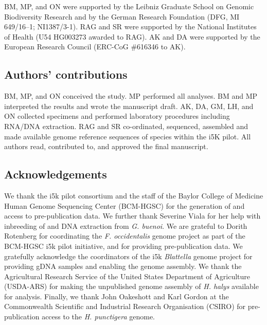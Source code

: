 BM, MP, and ON were supported by the Leibniz Graduate School on Genomic
Biodiversity Research and by the German Research Foundation (DFG, MI
649/16--1; NI1387/3-1). RAG and SR were supported by the National
Institutes of Health (U54 HG003273 awarded to RAG). AK and DA were
supported by the European Research Council (ERC-CoG \#616346 to AK).

\subsection{Authors' contributions}\label{authors-contributions}

BM, MP, and ON conceived the study. MP performed all analyses. BM and MP
interpreted the results and wrote the manuscript draft. AK, DA, GM, LH,
and ON collected specimens and performed laboratory procedures including
RNA/DNA extraction. RAG and SR co-ordinated, sequenced, assembled and
made available genome reference sequences of species within the i5K
pilot. All authors read, contributed to, and approved the final
manuscript.

\subsection{Acknowledgements}\label{acknowledgements}

We thank the i5k pilot consortium and the staff of the Baylor College of
Medicine Human Genome Sequencing Center (BCM-HGSC) for the generation of
and access to pre-publication data. We further thank Severine Viala for
her help with inbreeding of and DNA extraction from \emph{G. buenoi}. We
are grateful to Dorith Rotenberg for coordinating the \emph{F.
occidentalis} genome project as part of the BCM-HGSC i5k pilot
initiative, and for providing pre-publication data. We gratefully
acknowledge the coordinators of the i5k \emph{Blattella} genome project
for providing gDNA samples and enabling the genome assembly. We thank
the Agricultural Research Service of the United States Department of
Agriculture (USDA-ARS) for making the unpublished genome assembly of
\emph{H. halys} available for analysis. Finally, we thank John Oakeshott
and Karl Gordon at the Commonwealth Scientific and Industrial Research
Organisation (CSIRO) for pre-publication access to the \emph{H.
punctigera} genome.
